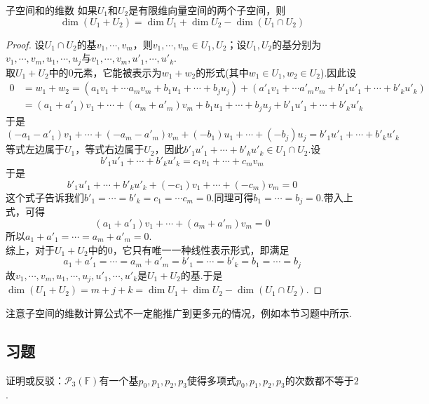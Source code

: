 \documentclass[lang=cn, zihao=5]{elegantbook}
\newcommand{\F}{\mathbb{F}}
\begin{document}
\begin{proposition}{子空间和的维数}
	如果$U_1$和$U_2$是有限维向量空间的两个子空间，则$$\dim (U_1+U_2) = \dim U_1 + \dim U_2 - \dim (U_1 \cap U_2)$$
\end{proposition}
\begin{proof}
	设$U_1 \cap U_2$的基$v_1, \cdots ,v_m$，则$v_1, \cdots ,v_m \in U_1,U_2$；设$U_1, U_2$的基分别为$v_1, \cdots ,v_m,u_1, \cdots ,u_j$与$v_1, \cdots ,v_m,u'_1, \cdots ,u'_k$. \\
	取$U_1+U_2$中的$0$元素，它能被表示为$w_1+w_2$的形式(其中$w_1 \in U_1,w_2 \in U_2$).因此设
	\begin{align*}
		0 &= w_1 + w_2 = (a_1v_1 + \cdots a_mv_m + b_1u_1 + \cdots + b_ju_j) + (a'_1v_1 + \cdots a'_mv_m + b'_1u'_1 + \cdots + b'_ku'_k) \\
		&= (a_1+a'_1)v_1 + \cdots + (a_m + a'_m)v_m + b_1u_1 + \cdots + b_ju_j + b'_1u'_1 + \cdots + b'_ku'_k
	\end{align*}
	于是
	$$ (-a_1-a'_1)v_1 + \cdots + (-a_m - a'_m)v_m + (-b_1)u_1 + \cdots + (-b_j)u_j = b'_1u'_1 + \cdots + b'_ku'_k $$
	等式左边属于$U_1$，等式右边属于$U_2$，因此$b'_1u'_1 + \cdots + b'_ku'_k \in U_1 \cap U_2$.设
	$$b'_1u'_1 + \cdots + b'_ku'_k = c_1v_1 + \cdots + c_mv_m$$
	于是$$b'_1u'_1 + \cdots + b'_ku'_k + (-c_1)v_1 + \cdots + (-c_m)v_m = 0$$
	这个式子告诉我们$b'_1 = \cdots = b'_k = c_1 = \cdots c_m =0$.同理可得$b_1 = \cdots = b_j =0$.带入上式，可得
	$$(a_1+a'_1)v_1 + \cdots + (a_m + a'_m)v_m = 0$$
	所以$a_1+a'_1 = \cdots = a_m + a'_m =0$. \\
	综上，对于$U_1+U_2$中的$0$，它只有唯一一种线性表示形式，即满足$$a_1+a'_1 = \cdots = a_m + a'_m = b'_1 = \cdots = b'_k = b_1 = \cdots = b_j$$
	故$v_1, \cdots ,v_m,u_1, \cdots ,u_j,u'_1, \cdots ,u'_k$是$U_1+U_2$的基.于是$\dim (U_1+U_2)=m+j+k = \dim U_1 + \dim U_2 - \dim (U_1 \cap U_2)$.
\end{proof}
\begin{remark}
	注意子空间的维数计算公式不一定能推广到更多元的情况，例如本节习题中所示.
\end{remark}

\subsection*{习题}

\begin{exercise}
	证明或反驳：$\mathcal{P}_{3} (\F)$有一个基$p_0,p_1,p_2,p_3$使得多项式$p_0,p_1,p_2,p_3$的次数都不等于$2$.
\end{exercise}
\end{document}

